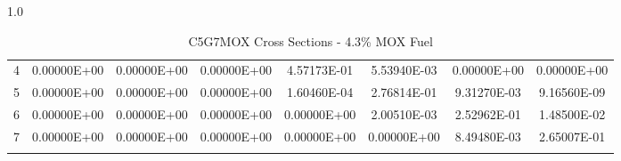 \begin{sidewaysfigure}
\begin{table}[H]
\begin{subtable}[h]{1.0\textwidth}
{\begin{tabular}{*8c}
4 & 0.00000E+00	 &	0.00000E+00 &	0.00000E+00 &	4.57173E-01 &	5.53940E-03 &	0.00000E+00 &	0.00000E+00 \\
5 & 0.00000E+00	 &	0.00000E+00 &	0.00000E+00 &	1.60460E-04 &	2.76814E-01 &	9.31270E-03 &	9.16560E-09 \\
6 & 0.00000E+00	 &	0.00000E+00 &	0.00000E+00 &	0.00000E+00 &	2.00510E-03 &	2.52962E-01 &	1.48500E-02 \\
7 & 0.00000E+00	 &	0.00000E+00 &	0.00000E+00 &	0.00000E+00 &	0.00000E+00 &	8.49480E-03 &	2.65007E-01 \\
        \bottomrule
        & & & & & & & 
    \end{tabular}}
  \end{subtable}
    \caption{C5G7MOX Cross Sections - 4.3\% MOX Fuel}
        \label{table:MOX-43}
\end{table}
\end{sidewaysfigure}

